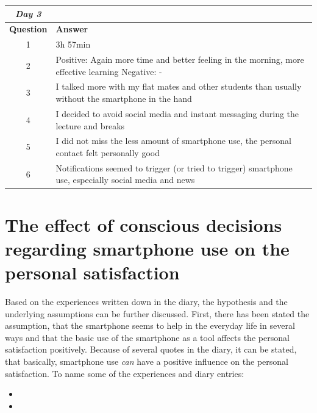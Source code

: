 \documentclass[11pt,a4paper]{article}
\begin{document}
\begin{table}[H]
	\centering
	
\begin{tabularx}{\textwidth}{cb}
\textbf{\textit{Day 3}} &    \\ \midrule[2pt]	
	\textbf{Question}&\textbf{Answer}\\ \toprule[1.3pt]	
	1 & 3h 57min  \\ \midrule[0.5pt]
	2 & Positive: Again more time and better feeling in the morning, more effective learning Negative: - \\ \midrule[0.5pt]
	3 & I talked more with my flat mates and other students than usually without the smartphone in the hand\\ \midrule[0.5pt]
	4 & I decided to avoid social media and instant messaging during the lecture and breaks \\ \midrule[0.5pt]
	5 & I did not miss the less amount of smartphone use, the personal contact felt personally good \\ \midrule[0.5pt]
	6 & Notifications seemed to trigger (or tried to trigger) smartphone use, especially social media and news \\  \bottomrule[2pt]
\end{tabularx}

\end{table}


\section*{The effect of conscious decisions regarding smartphone use on the personal satisfaction}
Based on the experiences written down in the diary, the hypothesis and the underlying assumptions can be further discussed. First, there has been stated the assumption, that the smartphone seems to help in the everyday life in several ways and that the basic use of the smartphone as a tool affects the personal satisfaction positively. Because of several quotes in the diary, it can be stated, that basically, smartphone use \textit{can} have a positive influence on the personal satisfaction. To name some of the experiences and diary entries:
\begin{itemize}
\item {}
\item {}
\end{itemize}
\end{document}
